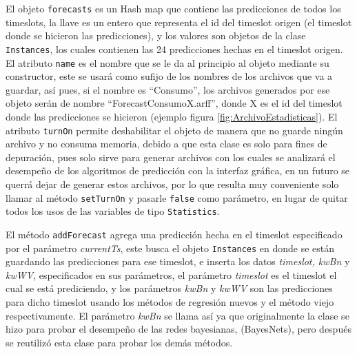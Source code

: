 El objeto \texttt{forecasts} es un Hash map que contiene las predicciones de todos los timeslots, la llave es un entero que representa el id del timeslot origen (el timeslot donde se hicieron las predicciones), y los valores son objetos de la clase \texttt{Instances}, los cuales contienen las 24 predicciones hechas en el timeslot origen. 
El atributo \texttt{name} es el nombre que se le da al principio al objeto mediante su constructor, este se usará como sufijo de los nombres de los archivos que va a guardar, así pues, si el nombre es ``Consumo'', los archivos generados por ese objeto serán de nombre ``ForecastConsumoX.arff'', donde X es el id del timeslot donde las predicciones se hicieron (ejemplo figura \ref{fig:ArchivoEstadisticas}).
El atributo \texttt{turnOn} permite deshabilitar el objeto de manera que no guarde ningún archivo y no consuma memoria, debido a que esta clase es solo para fines de depuración, pues solo sirve para generar archivos con los cuales se analizará el desempeño de los algoritmos de predicción con la interfaz gráfica, en un futuro se querrá dejar de generar estos archivos, por lo que resulta muy conveniente solo llamar al método \texttt{setTurnOn} y pasarle \texttt{false} como parámetro, en lugar de quitar todos los usos de las variables de tipo \texttt{Statistics}.

El método \texttt{addForecast} agrega una predicción hecha en el timeslot especificado por el parámetro \textit{currentTs}, este busca el objeto \texttt{Instances} en donde se están guardando las predicciones para ese timeslot, e inserta los datos \textit{timeslot, kwBn} y \textit{kwWV}, especificados en sus parámetros, el parámetro \textit{timeslot} es el timeslot el cual se está prediciendo, y los parámetros \textit{kwBn} y \textit{kwWV} son las predicciones para dicho timeslot usando los métodos de regresión nuevos y el método viejo respectivamente. El parámetro \textit{kwBn} se llama así ya que originalmente la clase se hizo para probar el desempeño de las redes bayesianas, (BayesNets), pero después se reutilizó esta clase para probar los demás métodos.


